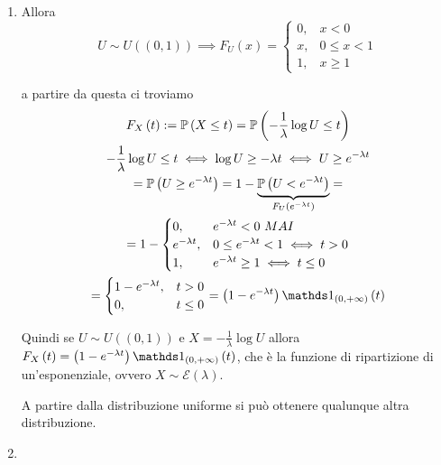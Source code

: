 \subsubsection{}
\begin{enumerate}
\item Allora\begin{equation*}
U\sim U\left(\left( 0,1\right)\right) \implies F_{U}\left( x\right) =\begin{cases}
0, & x< 0\\
x, & 0\leq x< 1\\
1, & x\geq 1
\end{cases}
\end{equation*}

a partire da questa ci troviamo\begin{gather*}
F_{X}\left( t\right) :=\PP\left( X\leq t\right) =\PP\left( -\frac{1}{\lambda }\log U\leq t\right)\\
-\frac{1}{\lambda }\log U\leq t\iff \log U\geq -\lambda t\iff U\geq e^{-\lambda t}\\
=\PP\left( U\geq e^{-\lambda t}\right) =1-\underbrace{\PP\left( U< e^{-\lambda t}\right)}_{F_{U}\left( e^{-\lambda t}\right)} =\\
=1-\begin{cases}
0, & e^{-\lambda t} < 0\ MAI\\
e^{-\lambda t} , & 0\leq e^{-\lambda t} < 1\iff t >0\\
1, & e^{-\lambda t} \geq 1\iff t\leq 0
\end{cases}\\
=\begin{cases}
1-e^{-\lambda t} , & t >0\\
0, & t\leq 0
\end{cases} =\left( 1-e^{-\lambda t}\right) \Ind_{\left( 0,+\infty \right)}\left( t\right)
\end{gather*}

Quindi se $U\sim U\left(\left( 0,1\right)\right)$ e $X=-\frac{1}{\lambda }\log U$ allora $F_{X}\left( t\right) =\left( 1-e^{-\lambda t}\right) \Ind_{\left( 0,+\infty \right)}\left( t\right)$, che è la funzione di ripartizione di un'esponenziale, ovvero $X\sim \mathcal{E}\left( \lambda \right)$.

A partire dalla distribuzione uniforme si può ottenere qualunque altra distribuzione.
\item 
\end{enumerate}
\Esercizio{}

